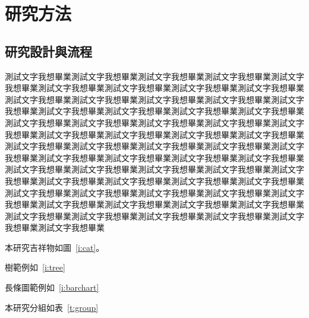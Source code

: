 \chapter{研究方法}
\section{研究設計與流程}
測試文字我想畢業測試文字我想畢業測試文字我想畢業測試文字我想畢業測試文字我想畢業測試文字我想畢業測試文字我想畢業測試文字我想畢業測試文字我想畢業測試文字我想畢業測試文字我想畢業測試文字我想畢業測試文字我想畢業測試文字我想畢業測試文字我想畢業測試文字我想畢業測試文字我想畢業測試文字我想畢業測試文字我想畢業測試文字我想畢業測試文字我想畢業測試文字我想畢業測試文字我想畢業測試文字我想畢業測試文字我想畢業測試文字我想畢業測試文字我想畢業測試文字我想畢業測試文字我想畢業測試文字我想畢業測試文字我想畢業測試文字我想畢業測試文字我想畢業測試文字我想畢業測試文字我想畢業測試文字我想畢業測試文字我想畢業測試文字我想畢業測試文字我想畢業測試文字我想畢業測試文字我想畢業測試文字我想畢業測試文字我想畢業測試文字我想畢業測試文字我想畢業測試文字我想畢業測試文字我想畢業測試文字我想畢業測試文字我想畢業測試文字我想畢業測試文字我想畢業測試文字我想畢業測試文字我想畢業測試文字我想畢業測試文字我想畢業測試文字我想畢業測試文字我想畢業測試文字我想畢業測試文字我想畢業測試文字我想畢業

本研究吉祥物如圖~\ref{i:cat}。


樹範例如~\ref{i:tree}


長條圖範例如~\ref{i:barchart}



本研究分組如表~\ref{t:group}







    






